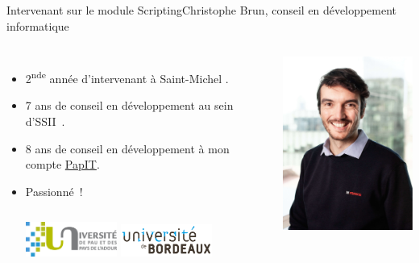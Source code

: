 \documentclass{beamer}
\begin{document}
    \begin{frame}{Intervenant sur le module Scripting}{Christophe Brun, conseil en développement informatique}

        \begin{columns}
            \begin{itemize}
                \item 2\textsuperscript{nde} année d'intervenant à Saint-Michel .

                \item 7 ans de conseil en développement au sein d'SSII~.

                \item 8 ans de conseil en développement à mon compte \href{https://papit.fr}{PapIT}.

                \item Passionné~!
                \bigbreak
                \begin{columns}
                    \centering
                    \includegraphics[width=3cm]{image/logo-uppa}
                    \centering
                    \includegraphics[width=3cm]{image/logo-universite-bordeaux}
                \end{columns}
            \end{itemize}
            \centering
            \includegraphics[width=5cm]{image/trombine-christophe}
        \end{columns}
    \end{frame}
\end{document}
